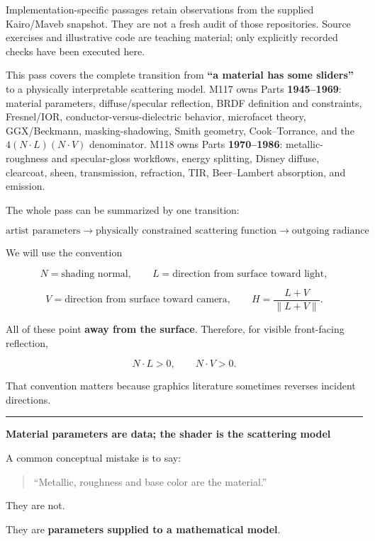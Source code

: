 Implementation-specific passages retain observations from the supplied Kairo/Maveb snapshot. They are not a fresh audit of those repositories. Source exercises and illustrative code are teaching material; only explicitly recorded checks have been executed here.

This pass covers the complete transition from \textbf{``a material has some sliders''} to a physically interpretable scattering model. M117 owns Parts \textbf{1945--1969}: material parameters, diffuse/specular reflection, BRDF definition and constraints, Fresnel/IOR, conductor-versus-dielectric behavior, microfacet theory, GGX/Beckmann, masking-shadowing, Smith geometry, Cook--Torrance, and the \(4(N\!\cdot L)(N\!\cdot V)\) denominator. M118 owns Parts \textbf{1970--1986}: metallic-roughness and specular-gloss workflows, energy splitting, Disney diffuse, clearcoat, sheen, transmission, refraction, TIR, Beer--Lambert absorption, and emission.

The whole pass can be summarized by one transition:

\[
\boxed{
\text{artist parameters}
\longrightarrow
\text{physically constrained scattering function}
\longrightarrow
\text{outgoing radiance}
}
\]

We will use the convention

\[
N=\text{shading normal},
\qquad
L=\text{direction from surface toward light},
\]

\[
V=\text{direction from surface toward camera},
\qquad
H=\frac{L+V}{\|L+V\|}.
\]

All of these point \textbf{away from the surface}. Therefore, for visible front-facing reflection,

\[
N\cdot L>0,
\qquad
N\cdot V>0.
\]

That convention matters because graphics literature sometimes reverses incident directions.

\begin{center}\rule{0.5\linewidth}{0.5pt}\end{center}

\textbf{Material parameters are data; the shader is the scattering model}

A common conceptual mistake is to say:

\begin{quote}
``Metallic, roughness and base color are the material.''
\end{quote}

They are not.

They are \textbf{parameters supplied to a mathematical model}.

